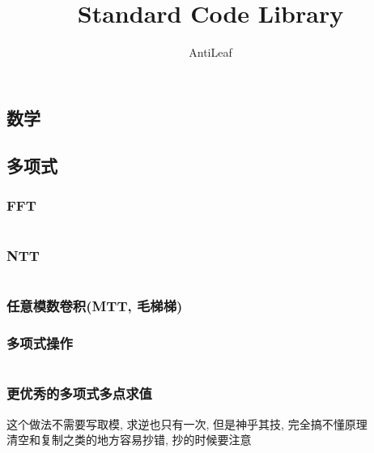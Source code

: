 \documentclass[a4paper, twoside]{article}
\title{Standard Code Library}
\author{AntiLeaf}
\date{}
\begin{document}
	\begin{titlepage}
		
		

	\end{titlepage}

	\begin{multicols}{2}
		
		\begin{spacing}{1}
			\tableofcontents
		\end{spacing}
		\newpage

	\end{multicols}

	\begin{multicols}{2}

		\section{数学}
			
			\subsection{多项式}
				\subsubsection{FFT}
					\inputminted{cpp}{../src/math/FFT.cpp}

				\subsubsection{NTT}
					\inputminted{cpp}{../src/math/NTT.cpp}

				\subsubsection{任意模数卷积(MTT, 毛梯梯)}
					

			
				\subsubsection{多项式操作}
					\inputminted{cpp}{../src/math/多项式操作.cpp}

				\subsubsection{更优秀的多项式多点求值}
					这个做法不需要写取模, 求逆也只有一次, 但是神乎其技, 完全搞不懂原理 \\
					清空和复制之类的地方容易抄错, 抄的时候要注意
					\inputminted{cpp}{../src/math/更优秀的多项式多点求值.cpp}


\end{multicols}
\end{document}
